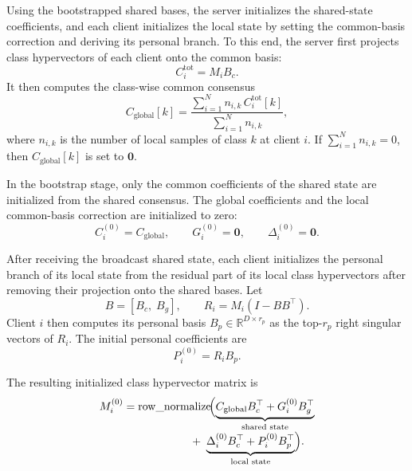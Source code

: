 \documentclass[lettersize,journal]{IEEEtran}
\newcommand{\rev}[1]{#1}
\begin{document}
Using the bootstrapped shared bases, the server initializes the \rev{shared-state coefficients}, and each client initializes the \rev{local state by setting the common-basis correction and deriving its personal branch}.
To this end, the server first projects class hypervectors of each client onto the common basis:
\begin{equation}
\label{eq:c_total}
C_i^{\mathrm{tot}} = M_i B_c.
\end{equation}
It then computes the class-wise common consensus
\begin{equation}
\label{eq:c_global}
C_{\mathrm{global}}[k]
=
\frac{\sum_{i=1}^{N} n_{i,k}\, C_i^{\mathrm{tot}}[k]}
{\sum_{i=1}^{N} n_{i,k}},
\end{equation}
where $n_{i,k}$ is the number of local samples of class $k$ at client $i$.
If $\sum_{i=1}^{N} n_{i,k}=0$, then $C_{\mathrm{global}}[k]$ is set to $\mathbf{0}$.

In the bootstrap stage, only the \rev{common coefficients of the shared state} are initialized from the shared consensus.
The \rev{global coefficients} and the \rev{local common-basis correction} are initialized to zero:
\begin{equation}
\label{eq:bootstrap_shared}
C_i^{(0)} = C_{\mathrm{global}}, \qquad
G_i^{(0)} = \mathbf{0}, \qquad
\Delta_i^{(0)} = \mathbf{0}.
\end{equation}

After receiving the broadcast shared state, each client initializes the \rev{personal branch of its local state} from the residual part of its local class hypervectors after removing \rev{their projection onto the shared bases}.
Let
\begin{equation}
B=[B_c,\;B_g], \qquad
R_i = M_i(I-BB^\top).
\end{equation}
Client $i$ then computes its personal basis $B_p\in\mathbb{R}^{D\times r_p}$ as the top-$r_p$ right singular vectors of $R_i$.
The initial personal coefficients are
\begin{equation}
\label{eq:personal_coords_init}
P_i^{(0)} = R_i B_p.
\end{equation}

The resulting initialized class hypervector matrix is
\begin{equation}
\label{eq:init_memory}
\begin{aligned}
M_i^{(0)}
&=
\rownorm\!\Bigl(
\underbrace{C_{\text{global}} B_c^\top + G_i^{(0)} B_g^\top}_{\text{\rev{shared state}}}
\\[-1mm]
&\qquad\qquad\qquad
+\;
\underbrace{\Delta_i^{(0)} B_c^\top + P_i^{(0)} B_p^\top}_{\text{\rev{local state}}}
\Bigr).
\end{aligned}
\end{equation}
\end{document}
